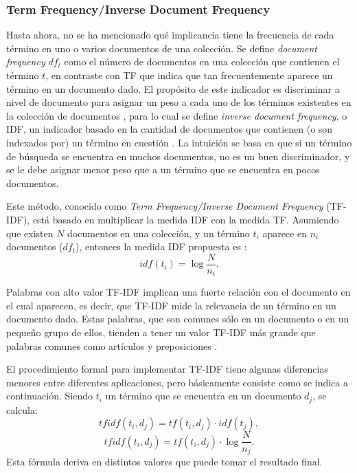 \subsubsection{Term Frequency/Inverse Document Frequency}
Hasta ahora, no se ha mencionado qué implicancia tiene la frecuencia de cada término en uno o varios documentos de una colección. Se define \textit{document frequency} \(df_t\) como el número de documentos en una colección que contienen el término \(t\), en contraste con TF que indica que tan frecuentemente aparece un término en un documento dado. El propósito de este indicador es discriminar a nivel de documento para asignar un peso a cada uno de los términos existentes en la colección de documentos \citep{christopher2008introduction}, para lo cual se define \textit{inverse document frequency}, o IDF, un indicador basado en la cantidad de documentos que contienen (o son indexados por) un término en cuestión \citep{robertson2004understanding}. La intuición se basa en que si un término de búsqueda se encuentra en muchos documentos, no es un buen discriminador, y se le debe asignar menor peso que a un término que se encuentra en pocos documentos.

\bigskip Este método, conocido como \textit{Term Frequency/Inverse Document Frequency} (TF-IDF), está basado en multiplicar la medida IDF con la medida TF. Asumiendo que existen \(N\) documentos en una colección, y un término \(t_i\) aparece en \(n_i\) documentos (\(df_t\)), entonces la medida IDF propuesta es \citep{sparck1972statistical}:
\[idf(t_i) = \log{\frac{N}{n_i}}.\]

Palabras con alto valor TF-IDF implican una fuerte relación con el documento en el cual aparecen, es decir, que TF-IDF mide la relevancia de un término en un documento dado. Estas palabras, que son comunes sólo en un documento o en un pequeño grupo de ellos, tienden a tener un valor TF-IDF más grande que palabras comunes como artículos y preposiciones \citep{ramos2003using}.

\bigskip El procedimiento formal para implementar TF-IDF tiene algunas diferencias menores entre diferentes aplicaciones, pero básicamente consiste como se indica a continuación. Siendo \(t_i\) un término que se encuentra en un documento \(d_j\), se calcula:
\[tfidf(t_i, d_j) = tf(t_i, d_j) \cdot idf(t_j),\]
\[tfidf(t_i, d_j) = tf(t_i, d_j) \cdot \log{\frac{N}{n_j}}.\]
Esta fórmula deriva en distintos valores que puede tomar el resultado final.

